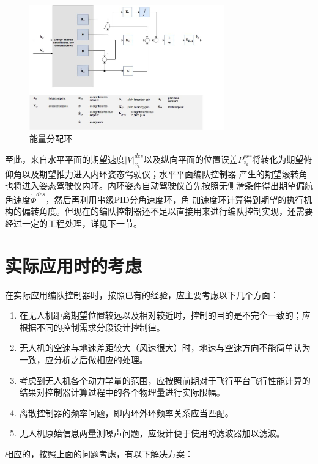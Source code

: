 \begin{figure}[H]
    \centering
    \includegraphics[width=0.75\textwidth]{figures/c3/TECS_pitch.jpg}
    \caption{能量分配环}\label{fig:balance_energy}
\end{figure}
至此，来自水平平面的期望速度$|V|_{x_k}^{des}$以及纵向平面的位置误差$P_{z_k}^{err}$将转化为期望俯仰角以及期望推力进入内环姿态驾驶仪；水平平面编队控制器
产生的期望滚转角也将进入姿态驾驶仪内环。内环姿态自动驾驶仪首先按照无侧滑条件得出期望偏航角速度$\dot{\Phi}^{des}$，然后再利用串级PID分角速度环，角
加速度环计算得到期望的执行机构的偏转角度。但现在的编队控制器还不足以直接用来进行编队控制实现，还需要经过一定的工程处理，详见下一节。
\section{实际应用时的考虑}
在实际应用编队控制器时，按照已有的经验，应主要考虑以下几个方面：
\begin{enumerate}
    \item 在无人机距离期望位置较远以及相对较近时，控制的目的是不完全一致的；应根据不同的控制需求分段设计控制律。
    \item 无人机的空速与地速差距较大（风速很大）时，地速与空速方向不能简单认为一致，应分析之后做相应的处理。
    \item 考虑到无人机各个动力学量的范围，应按照前期对于飞行平台飞行性能计算的结果对控制器计算过程中的各个物理量进行实际限幅。
    \item 离散控制器的频率问题，即内环外环频率关系应当匹配。
    \item 无人机原始信息两量测噪声问题，应设计便于使用的滤波器加以滤波。
\end{enumerate}
相应的，按照上面的问题考虑，有以下解决方案：

